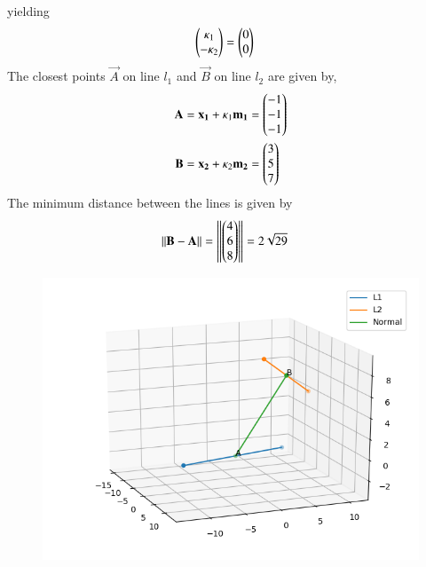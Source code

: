 yielding
\begin{align}
\begin{pmatrix}\kappa_1\\-\kappa_2\end{pmatrix} &= \begin{pmatrix}0\\0\end{pmatrix}
\end{align}
The closest points $\vec{A}$ on line $l_1$ and $\vec{B}$ on line $l_2$ are given by,
\begin{align}
\mathbf{A} &= \mathbf{x_1} + \kappa_1\mathbf{m_1}
= \begin{pmatrix}-1\\-1\\-1\end{pmatrix}\\
\mathbf{B} &= \mathbf{x_2} + \kappa_2\mathbf{m_2}
= \begin{pmatrix}3\\5\\7\end{pmatrix}
\end{align}
The minimum distance between the lines is given by
\begin{align}
\left\lVert\mathbf{B}-\mathbf{A}\right\rVert &= \left\lVert\begin{pmatrix}4\\6\\8\end{pmatrix}\right\rVert
= 2\sqrt{29}
\end{align}
%
\begin{figure}[!ht]
\centering
\includegraphics[width=\columnwidth]{chapters/12/11/2/15/figs/Figure_1.png}
\caption{}
\label{fig:chapters/12/11/2/15/}
\end{figure}

